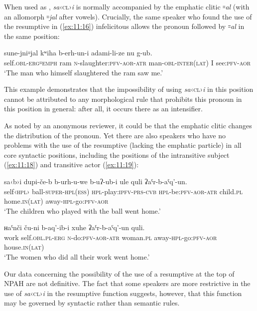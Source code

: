 ﻿\documentclass[output=paper]{langsci/langscibook}
\begin{document}
When used as , \emph{sa}‹\textsc{cl}›\emph{i} is normally
accompanied by the emphatic clitic ꞊\emph{al} (with an allomorph
꞊\emph{jal} after vowels). Crucially, the same speaker who found the use
of the resumptive in (\ref{ex:11:16}) infelicitous allows the pronoun followed by
꞊\emph{al} in the same position:

\ea  %
\gll  sune-jni꞊jal kʷiha b-erh-un-i adami-li-ze   nu g-ub.\\
  self.\textsc{obl}-\textsc{erg}꞊\textsc{emph} ram \textsc{n}-slaughter:\textsc{pfv}-\textsc{aor}-\textsc{atr} man-\textsc{obl}-\textsc{inter}(\textsc{lat})   I see:\textsc{pfv}-\textsc{aor}\\
\glt
  `The man who himself slaughtered the ram saw me.'
\z

This example demonstrates that the impossibility of using
\emph{sa}‹\textsc{cl}›\emph{i} in this position cannot be attributed to
any morphological rule that prohibits this pronoun in this position in
general: after all, it occurs there as an intensifier.

As noted by an anonymous reviewer, it could be that the emphatic clitic
changes the distribution of the pronoun. Yet there are also speakers who
have no problems with the use of the resumptive (lacking the emphatic
particle) in all core syntactic positions, including the positions of
the intransitive subject (\ref{ex:11:18}) and transitive actor (\ref{ex:11:19}):

\ea \label{ex:11:18} %
\gll  sa‹b›i dupi-če-b b-urh-u-we b-uʔ-ub-i ule quli ʡaˤr-b-aˤq'-un.\\
self‹\textsc{hpl}› ball-\textsc{super}-\textsc{hpl}(\textsc{ess}) \textsc{hpl}-play:\textsc{ipfv}-\textsc{prs}-\textsc{cvb} \textsc{hpl}-be:\textsc{pfv}-\textsc{aor}-\textsc{atr} child.\textsc{pl} home.\textsc{in}(\textsc{lat}) away-\textsc{hpl}-go:\textsc{pfv}-\textsc{aor}\\
\glt `The children who played with the ball went home.'

\ex \label{ex:11:19} %
\gll  ʜaˤnči ču-ni b-aq'-ib-i xuhe ʡaˤr-b-aˤq'-un quli.\\
work self.\textsc{obl}.\textsc{pl}-\textsc{erg} \textsc{n}-do:\textsc{pfv}-\textsc{aor}-\textsc{atr} woman.\textsc{pl} away-\textsc{hpl}-go:\textsc{pfv}-\textsc{aor} house.\textsc{in}(\textsc{lat})\\
\glt `The women who did all their work went home.'
\z

Our data concerning the possibility of the use of a resumptive at the
top of NPAH are not definitive. The fact that some speakers are more
restrictive in the use of \emph{sa}‹\textsc{cl}›\emph{i} in the
resumptive function suggests, however, that this function may be
governed by syntactic rather than semantic rules.
\end{document}
